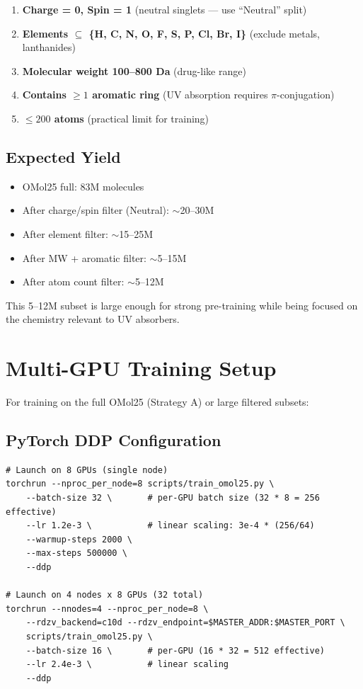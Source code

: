 \documentclass[11pt,a4paper]{article}
\begin{document}
\begin{enumerate}[nosep]
    \item \textbf{Charge = 0, Spin = 1} (neutral singlets --- use ``Neutral'' split)
    \item \textbf{Elements $\subseteq$ \{H, C, N, O, F, S, P, Cl, Br, I\}}
          (exclude metals, lanthanides)
    \item \textbf{Molecular weight 100--800 Da} (drug-like range)
    \item \textbf{Contains $\geq 1$ aromatic ring} (UV absorption requires
          $\pi$-conjugation)
    \item \textbf{$\leq 200$ atoms} (practical limit for training)
\end{enumerate}

\subsection{Expected Yield}

\begin{itemize}[nosep]
    \item OMol25 full: 83M molecules
    \item After charge/spin filter (Neutral): $\sim$20--30M
    \item After element filter: $\sim$15--25M
    \item After MW + aromatic filter: $\sim$5--15M
    \item After atom count filter: $\sim$5--12M
\end{itemize}

This 5--12M subset is large enough for strong pre-training while being focused
on the chemistry relevant to UV absorbers.

\section{Multi-GPU Training Setup}

For training on the full OMol25 (Strategy A) or large filtered subsets:

\subsection{PyTorch DDP Configuration}

\begin{verbatim}
# Launch on 8 GPUs (single node)
torchrun --nproc_per_node=8 scripts/train_omol25.py \
    --batch-size 32 \       # per-GPU batch size (32 * 8 = 256 effective)
    --lr 1.2e-3 \           # linear scaling: 3e-4 * (256/64)
    --warmup-steps 2000 \
    --max-steps 500000 \
    --ddp

# Launch on 4 nodes x 8 GPUs (32 total)
torchrun --nnodes=4 --nproc_per_node=8 \
    --rdzv_backend=c10d --rdzv_endpoint=$MASTER_ADDR:$MASTER_PORT \
    scripts/train_omol25.py \
    --batch-size 16 \       # per-GPU (16 * 32 = 512 effective)
    --lr 2.4e-3 \           # linear scaling
    --ddp
\end{verbatim}
\end{document}
